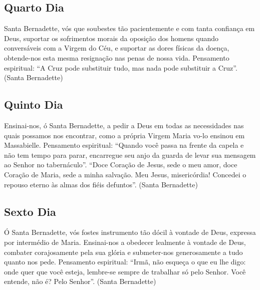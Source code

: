 \documentclass[18pt]{article}
\begin{document}
\begin{justify}
\textbf{\textit{}} %

\subsection*{Quarto Dia}

\textbf{\textit{}} %

Santa Bernadette, vós que soubestes tão pacientemente e com tanta confiança em Deus, suportar os sofrimentos morais da oposição dos homens quando conversáveis com a Virgem do Céu, e suportar as dores físicas da doença, obtende-nos esta mesma resignação nas penas de nossa vida. Pensamento espiritual: “A Cruz pode substituir tudo, mas nada pode substituir a Cruz”. (Santa Bernadette)

\textbf{\textit{}} %

\subsection*{Quinto Dia}

\textbf{\textit{}} %

Ensinai-nos, ó Santa Bernadette, a pedir a Deus em todas as necessidades nas quais possamos nos encontrar, como a própria Virgem Maria vo-lo ensinou em Massabielle. Pensamento espiritual: “Quando você passa na frente da capela e não tem tempo para parar, encarregue seu anjo da guarda de levar sua mensagem ao Senhor no tabernáculo”. “Doce Coração de Jesus, sede o meu amor, doce Coração de Maria, sede a minha salvação. Meu Jesus, misericórdia! Concedei o repouso eterno às almas dos fiéis defuntos”. (Santa Bernadette)

\textbf{\textit{}} %

\subsection*{Sexto Dia}

\textbf{\textit{}} %

Ó Santa Bernadette, vós fostes instrumento tão dócil à vontade de Deus, expressa por intermédio de Maria. Ensinai-nos a obedecer lealmente à vontade de Deus, combater corajosamente pela sua glória e submeter-nos generosamente a tudo quanto nos pede. Pensamento espiritual: “Irmã, não esqueça o que eu lhe digo: onde quer que você esteja, lembre-se sempre de trabalhar só pelo Senhor. Você entende, não é? Pelo Senhor”. (Santa Bernadette)


\end{justify}
\end{document}
